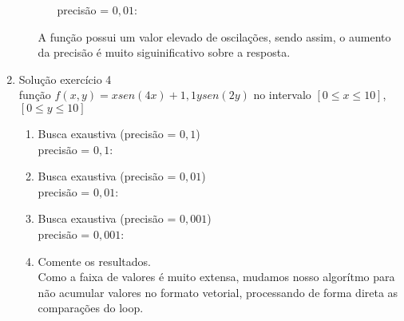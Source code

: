 \documentclass[a4paper, 12pt]{article}
\begin{document}
\begin{enumerate}
\begin{enumerate}
\begin{enumerate}[{b}.1)]
                    \newpage
                    precisão = $0,01$:
                    
            \end{enumerate}

            A função possui um valor elevado de oscilações,
            sendo assim, o aumento da precisão é muito
            siguinificativo sobre a resposta.
   \end{enumerate}

   \item Solução exercício 4
	\\
		função $f(x,y) = x sen(4 x) + 1,1 y sen(2 y)$ no intervalo $[0 \leq x \leq 10]$, $[0 \leq y \leq 10]$
   \begin{enumerate}
		\item Busca exaustiva (precisão = $0,1$)
            \\
            precisão = $0,1$:
            
		\item Busca exaustiva (precisão = $0,01$)
            \\
            precisão = $0,01$:
            
		\item Busca exaustiva (precisão = $0,001$)
            \\
            precisão = $0,001$:
            
        \item Comente os resultados.
            \\
            Como a faixa de valores é muito extensa, mudamos
            nosso algorítmo para não acumular valores no formato
            vetorial, processando de forma direta as comparações
            do loop.
   \end{enumerate}

\end{enumerate}
\end{document}
